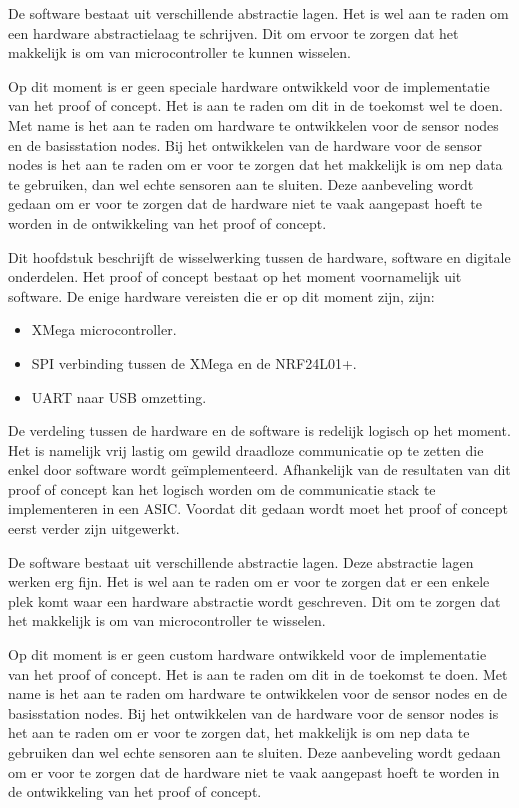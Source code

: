 De software bestaat uit verschillende abstractie lagen. Het is wel aan te raden om een hardware abstractielaag te schrijven. Dit om ervoor te zorgen dat het makkelijk is om van microcontroller te kunnen wisselen.

Op dit moment is er geen speciale hardware ontwikkeld voor de implementatie van het proof of concept. Het is aan te raden om dit in de toekomst wel te doen. Met name is het aan te raden om hardware te ontwikkelen voor de sensor nodes en de basisstation nodes. Bij het ontwikkelen van de hardware voor de sensor nodes is het aan te raden om er voor te zorgen dat het makkelijk is om nep data te gebruiken, dan wel echte sensoren aan te sluiten. Deze aanbeveling wordt gedaan om er voor te zorgen dat de hardware niet te vaak aangepast hoeft te worden in de ontwikkeling van het proof of concept.

Dit hoofdstuk beschrijft de wisselwerking tussen de hardware, software en digitale onderdelen. Het proof of concept bestaat op het moment voornamelijk uit software. De enige hardware vereisten die er op dit moment zijn, zijn:
\begin{itemize}
    \item XMega microcontroller.
    \item SPI verbinding tussen de XMega en de NRF24L01+.
    \item UART naar USB omzetting.
\end{itemize}
De verdeling tussen de hardware en de software is redelijk logisch op het moment. Het is namelijk vrij lastig om gewild draadloze communicatie op te zetten die enkel door software wordt geïmplementeerd. Afhankelijk van de resultaten van dit proof of concept kan het logisch worden om de communicatie stack te implementeren in een ASIC. Voordat dit gedaan wordt moet het proof of concept eerst verder zijn uitgewerkt.

De software bestaat uit verschillende abstractie lagen. Deze abstractie lagen werken erg fijn. Het is wel aan te raden om er voor te zorgen dat er een enkele plek komt waar een hardware abstractie wordt geschreven. Dit om te zorgen dat het makkelijk is om van microcontroller te wisselen.

Op dit moment is er geen custom hardware ontwikkeld voor de implementatie van het proof of concept. Het is aan te raden om dit in de toekomst te doen. Met name is het aan te raden om hardware te ontwikkelen voor de sensor nodes en de basisstation nodes. Bij het ontwikkelen van de hardware voor de sensor nodes is het aan te raden om er voor te zorgen dat, het makkelijk is om nep data te gebruiken dan wel echte sensoren aan te sluiten. Deze aanbeveling wordt gedaan om er voor te zorgen dat de hardware niet te vaak aangepast hoeft te worden in de ontwikkeling van het proof of concept.

